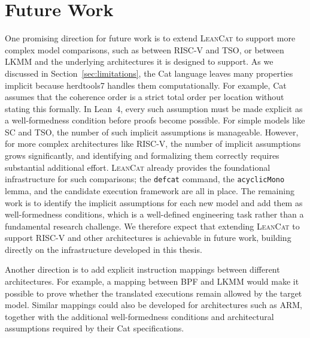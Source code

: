 \section{Future Work}
\label{sec:future-work}
One promising direction for future work is to extend \textsc{LeanCat} to support more complex model comparisons, such as between RISC-V and TSO, or between LKMM and the underlying architectures it is designed to support. As we discussed in Section~\ref{sec:limitations}, the Cat language leaves many properties implicit because herdtools7 handles them computationally. For example, Cat assumes that the coherence order is a strict total order per location without stating this formally. In Lean~4, every such assumption must be made explicit as a well-formedness condition before proofs become possible. For simple models like SC and TSO, the number of such implicit assumptions is manageable. However, for more complex architectures like RISC-V, the number of implicit assumptions grows significantly, and identifying and formalizing them correctly requires substantial additional effort. \textsc{LeanCat} already provides the foundational infrastructure for such comparisons; the \texttt{defcat} command, the \texttt{acyclicMono} lemma, and the candidate execution framework are all in place. The remaining work is to identify the implicit assumptions for each new model and add them as well-formedness conditions, which is a well-defined engineering task rather than a fundamental research challenge. We therefore expect that extending \textsc{LeanCat} to support RISC-V and other architectures is achievable in future work, building directly on the infrastructure developed in this thesis.

Another direction is to add explicit instruction mappings between different architectures. For example, a mapping between BPF and LKMM would make it possible to prove whether the translated executions remain allowed by the target model. Similar mappings could also be developed for architectures such as ARM, together with the additional well-formedness conditions and architectural assumptions required by their Cat specifications.
